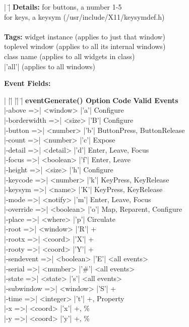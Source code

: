 \begin{tabbing}
|       |\= \kill
{\bf Details:} \> for buttons, a number 1-5 \\
	\> for keys, a keysym (/usr/include/X11/keysymdef.h) \\
\\
{\bf Tags:}    \>  widget instance (applies to just that window) \\
	\>  toplevel window (applies to all its internal windows) \\
	\>  class name (applies to all widgets in class) \\
	\>  |'all'| (applies to all windows)
\end{tabbing}

{\bf Event Fields:}
\begin{tabbing}
|  |\=|                       |\=|     |\= \kill
  \>  {\bf eventGenerate() Option}     \> {\bf Code} \>  {\bf Valid Events} \\
  \>  |-above =>| <window>         \> |'a'|  \>  Configure \\
  \>  |-borderwidth =>| <size>     \> |'B'|  \>  Configure \\
  \>  |-button =>| <number>        \> |'b'|  \>  ButtonPress, ButtonRelease \\
  \>  |-count =>| <number>         \> |'c'|  \>  Expose \\
  \>  |-detail =>| <detail>        \> |'d'|  \>  Enter, Leave, Focus \\
  \>  |-focus =>| <boolean>        \> |'f'|  \>  Enter, Leave \\
  \>  |-height =>| <size>          \> |'h'|  \>  Configure \\
  \>  |-keycode =>| <number>       \> |'k'|  \>  KeyPress, KeyRelease \\
  \>  |-keysym =>| <name>          \> |'K'|  \>  KeyPress, KeyRelease \\
  \>  |-mode =>| <notify>          \> |'m'|  \>  Enter, Leave, Focus \\
  \>  |-override =>| <boolean>     \> |'o'|  \>  Map, Reparent, Configure \\
  \>  |-place =>| <where>          \> |'p'|  \>  Circulate \\
  \>  |-root =>| <window>          \> |'R'|  \>  + \\
  \>  |-rootx =>| <coord>          \> |'X'|  \>  + \\
  \>  |-rooty =>| <coord>          \> |'Y'|  \>  + \\
  \>  |-sendevent =>| <boolean>    \> |'E'|  \>  <all events> \\
  \>  |-serial =>| <number>        \> |'#'| \>  <all events> \\
  \>  |-state =>| <state>          \> |'s'|  \>  <all events> \\
  \>  |-subwindow =>| <window>     \> |'S'|  \>  + \\
  \>  |-time =>| <integer>         \> |'t'|  \>  +, Property \\
  \>  |-x =>| <coord>              \> |'x'|  \>  +, \% \\
  \>  |-y =>| <coord>              \> |'y'|  \>  +, \% \\
\end{tabbing}
